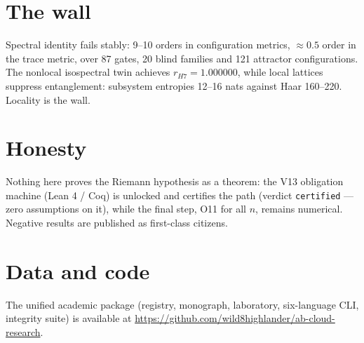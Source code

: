 \documentclass[11pt,a4paper]{article}
\begin{document}
\section{The wall}
Spectral identity fails stably: 9--10 orders in configuration metrics,
$\approx 0.5$ order in the trace metric, over 87 gates, 20 blind families
and 121 attractor configurations. The nonlocal isospectral twin achieves
$r_{H7} = 1.000000$, while local lattices suppress entanglement: subsystem
entropies 12--16 nats against Haar 160--220. Locality is the wall.

\section{Honesty}
Nothing here proves the Riemann hypothesis as a theorem: the V13
obligation machine (Lean 4 / Coq) is unlocked and certifies the path
(verdict \texttt{certified} --- zero assumptions on it), while the final
step, O11 for all $n$, remains numerical. Negative results are published as
first-class citizens.

\section{Data and code}
The unified academic package (registry, monograph, laboratory, six-language
CLI, integrity suite) is available at
\url{https://github.com/wild8highlander/ab-cloud-research}.
\end{document}
